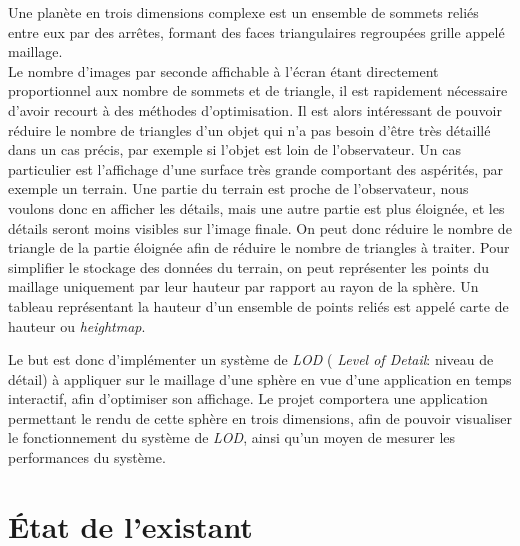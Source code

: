 \documentclass[12pt]{report}
\begin{document}
Une planète en trois dimensions complexe est un ensemble de sommets reliés
entre eux par des arrêtes, formant des faces triangulaires regroupées grille appelé maillage.\\
Le nombre d'images par seconde affichable à l'écran étant directement proportionnel aux nombre de sommets et de triangle, il est rapidement nécessaire d'avoir recourt à des méthodes d'optimisation.
Il est alors intéressant de pouvoir réduire le nombre de triangles d'un
objet qui n'a pas besoin d'être très détaillé dans un cas précis, par
exemple si l'objet est loin de l'observateur. Un cas particulier est
l'affichage d'une surface très grande comportant des aspérités, par
exemple un terrain. Une partie du terrain est proche de l'observateur,
nous voulons donc en afficher les détails, mais une autre partie est
plus éloignée, et les détails seront moins visibles sur l'image finale.
On peut donc réduire le nombre de triangle de la partie éloignée afin de
réduire le nombre de triangles à traiter. Pour simplifier le stockage
des données du terrain, on peut représenter les points du maillage
uniquement par leur hauteur par rapport au rayon de la sphère. Un
tableau représentant la hauteur d'un ensemble de points reliés est
appelé carte de hauteur ou \emph{heightmap}.

Le but est donc d'implémenter un système de \emph{LOD} (
\emph{Level of Detail}: niveau de détail) à appliquer sur le maillage
d'une sphère en vue d'une application en temps interactif, afin
d'optimiser son affichage. Le projet comportera une application
permettant le rendu de cette sphère en trois dimensions, afin de pouvoir
visualiser le fonctionnement du système de \emph{LOD}, ainsi qu'un moyen
de mesurer les performances du système.

\newpage

\chapter*{État de l'existant}
\setcounter{chapter}{2}
\end{document}
